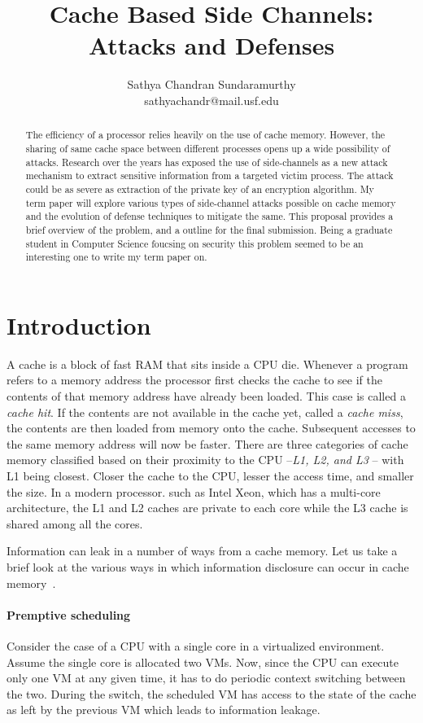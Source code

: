 \documentclass[onecolumn]{IEEEtran}
\title{Cache Based Side Channels: Attacks and Defenses}
\author{Sathya Chandran Sundaramurthy \\ \small{sathyachandr@mail.usf.edu}}
\begin{document}
\maketitle
\begin{abstract}
The efficiency of a processor relies heavily on the use of cache
memory.  However, the sharing of same cache space between different
processes opens up a wide possibility of attacks.  Research over the
years has exposed the use of side-channels as a new attack mechanism
to extract sensitive information from a targeted victim process. The
attack could be as severe as extraction of the private key of an
encryption algorithm.  My term paper will explore various types of
side-channel attacks possible on cache memory and the evolution of
defense techniques to mitigate the same.  This proposal provides a
brief overview of the problem, and a outline for the final submission.
Being a graduate student in Computer Science foucsing on security this
problem seemed to be an interesting one to write my term paper on.
\end{abstract}
\section{Introduction}

A cache is a block of fast RAM that sits inside a CPU die.  Whenever a
program refers to a memory address the processor first checks the
cache to see if the contents of that memory address have already been
loaded.  This case is called a {\it cache hit}.  If the contents are
not available in the cache yet, called a {\it cache miss}, the
contents are then loaded from memory onto the cache.  Subsequent
accesses to the same memory address will now be faster. There are
three categories of cache memory classified based on their proximity
to the CPU --{\it L1, L2, and L3} -- with L1 being closest.  Closer
the cache to the CPU, lesser the access time, and smaller the size.
In a modern processor. such as Intel Xeon, which has a
multi-core architecture, the L1 and L2 caches are private to each core
while the L3 cache is shared among all the cores.

Information can leak in a number of ways from a cache memory.  Let us take
a brief look at the various ways in which information disclosure can occur
in cache memory~\cite{kim2012stealthmem}.

\paragraph{Premptive scheduling} Consider the case of a CPU with a
single core in a virtualized environment.  Assume the single core is
allocated two VMs.  Now, since the CPU can execute only one VM at any
given time, it has to do periodic context switching between the two.
During the switch, the scheduled VM has access to the state of the
cache as left by the previous VM which leads to information leakage.
\end{document}
